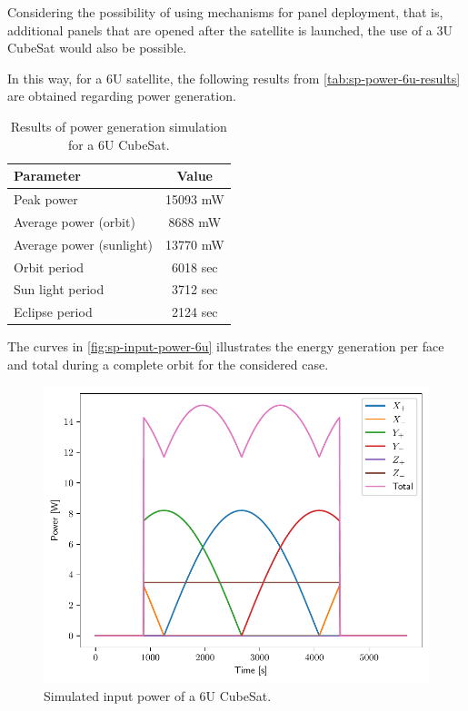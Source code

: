 Considering the possibility of using mechanisms for panel deployment, that is, additional panels that are opened after the satellite is launched, the use of a 3U CubeSat would also be possible.


In this way, for a 6U satellite, the following results from \autoref{tab:sp-power-6u-results} are obtained regarding power generation.

\begin{table}[!ht]
    \centering
    \begin{tabular}{lc}
        \toprule[1.5pt]
        \textbf{Parameter} & \textbf{Value} \\
        \midrule
        Peak power                  & 15093 mW \\
        Average power (orbit)       & 8688 mW \\
        Average power (sunlight)    & 13770 mW \\
        Orbit period                & 6018 sec \\
        Sun light period            & 3712 sec \\
        Eclipse period              & 2124 sec \\
        \bottomrule[1.5pt]
    \end{tabular}
    \caption{Results of power generation simulation for a 6U CubeSat.}
    \label{tab:sp-power-6u-results}
\end{table}


The curves in \autoref{fig:sp-input-power-6u} illustrates the energy generation per face and total during a complete orbit for the considered case.

\begin{figure}[!ht]
    \begin{center}
        \includegraphics[width=0.8\columnwidth]{curves/sp-input-power-6u}
        \caption{Simulated input power of a 6U CubeSat.}
        \label{fig:sp-input-power-6u}
    \end{center}
\end{figure}

